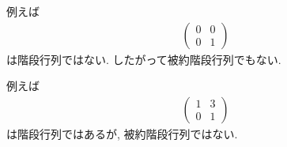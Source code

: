 \begin{example}
例えば
  \begin{align*}
    \begin{pmatrix}
      0&0\\0&1
    \end{pmatrix}
  \end{align*}
  は階段行列ではない.
  したがって被約階段行列でもない.

例えば
  \begin{align*}
    \begin{pmatrix}
      1&3\\0&1
    \end{pmatrix}
  \end{align*}
  は階段行列ではあるが,
  被約階段行列ではない.
\end{example}

